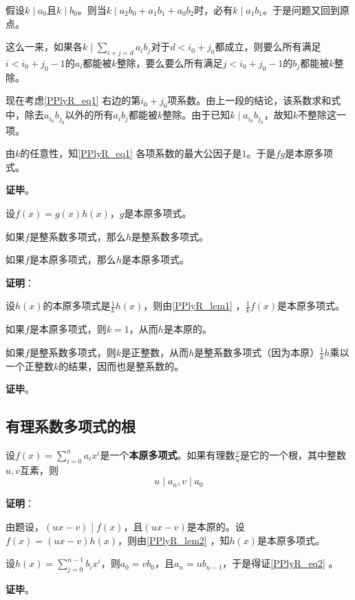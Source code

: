 假设$k\mid a_0$且$k\mid b_0$。则当$k\mid a_2b_0+a_1b_1+a_0b_2$时，必有$k\mid a_1b_1$。于是问题又回到原点。

这么一来，如果各$k\mid\sum_{i+j=d}a_ib_j$对于$d<i_0+j_0$都成立，则要么所有满足$i<i_0+j_0-1$的$a_i$都能被$k$整除，要么要么所有满足$j<i_0+j_0-1$的$b_j$都能被$k$整除。

现在考虑\autoref{PPlyR_eq1} 右边的第$i_0+j_0$项系数。由上一段的结论，该系数求和式中，除去$a_{i_0}b_{j_0}$以外的所有$a_ib_j$都能被$k$整除。由于已知$k\mid a_{i_0}b_{j_0}$，故知$k$不整除这一项。

由$k$的任意性，知\autoref{PPlyR_eq1} 各项系数的最大公因子是$1$。于是$fg$是本原多项式。



\textbf{证毕}。



\begin{lemma}{}\label{PPlyR_lem2}
设$f(x)=g(x)h(x)$，$g$是本原多项式。

如果$f$是整系数多项式，那么$h$是整系数多项式。

如果$f$是本原多项式，那么$h$是本原多项式。
\end{lemma}

\textbf{证明}：

设$h(x)$的本原多项式是$\frac{1}{k}h(x)$，则由\autoref{PPlyR_lem1} ，$\frac{1}{k}f(x)$是本原多项式。

如果$f$是本原多项式，则$k=1$，从而$h$是本原的。

如果$f$是整系数多项式，则$k$是正整数，从而$h$是整系数多项式（因为本原）$\frac{1}{k}h$乘以一个正整数$k$的结果，因而也是整系数的。



\textbf{证毕}。




\subsection{有理系数多项式的根}

\begin{theorem}{}
设$f(x)=\sum_{i=0}^n a_ix^i$是一个\textbf{本原多项式}。如果有理数$\frac{v}{u}$是它的一个根，其中整数$u, v$互素，则
\begin{equation}\label{PPlyR_eq2}
u\mid a_n, v\mid a_0
\end{equation}
\end{theorem}

\textbf{证明}：

由题设，$(ux-v)\mid f(x)$，且$(ux-v)$是本原的。设$f(x)=(ux-v)h(x)$，则由\autoref{PPlyR_lem2} ，知$h(x)$是本原多项式。

设$h(x)=\sum_{j=0}^{n-1} b_ix^i$，则$a_0=vb_0$，且$a_n=ub_{n-1}$，于是得证\autoref{PPlyR_eq2} 。

\textbf{证毕}。














